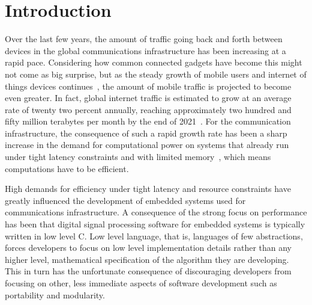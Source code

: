 
%
%

\chapter{Introduction}

Over the last few years, the amount of traffic going back and forth between devices in the global communications infrastructure has been increasing at a rapid pace. Considering how common connected gadgets have become this might not come as big surprise, but as the steady growth of mobile users and internet of things devices continues~\cite{ericsson2016}, the amount of mobile traffic is projected to become even greater. In fact, global internet traffic is estimated to grow at an average rate of twenty two percent annually, reaching approximately two hundred and fifty million terabytes per month by the end of 2021~\cite{cisco2016}. For the communication infrastructure, the consequence of such a rapid growth rate has been a sharp increase in the demand for computational power on systems that already run under tight latency constraints and with limited memory~\cite{persson2014}, which means computations have to be efficient.

High demands for efficiency under tight latency and resource constraints have greatly influenced the development of embedded systems used for communications infrastructure. A consequence of the strong focus on performance has been that digital signal processing software for embedded systems is typically written in low level C. Low level language, that is, languages of few abstractions, forces developers to focus on low level implementation details rather than any higher level, mathematical specification of the algorithm they are developing. This in turn has the unfortunate consequence of discouraging developers from focusing on other, less immediate aspects of software development such as portability and modularity.





